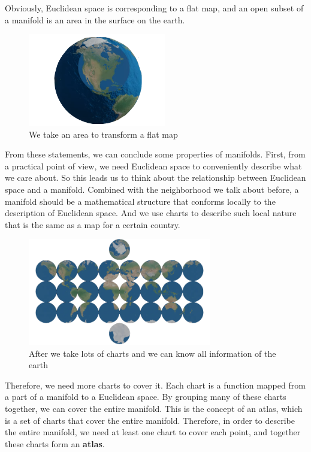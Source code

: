 Obviously, Euclidean space is corresponding to a flat map, and an open subset of a manifold is an area in the surface on the earth. 

\begin{figure}[htbp]
    \centering
    \includegraphics[width=6cm]{pic/earth.png}
    \caption{We take an area to transform a flat map}
\end{figure}

From these statements, we can conclude some properties of manifolds. First, from a practical point of view, we need Euclidean space to conveniently describe what we care about. So this leads us to think about the relationship between Euclidean space and a manifold. Combined with the neighborhood we talk about before, a manifold should be a mathematical structure that conforms locally to the description of Euclidean space. And we use charts to describe such local nature that is the same as a map for a certain country. 

\begin{figure}[htbp]
    \centering
    \includegraphics[width=8cm]{pic/earths.png}
    \caption{After we take lots of charts and we can know all information of the earth}
\end{figure}

Therefore, we need more charts to cover it. Each chart is a function mapped from a part of a manifold to a Euclidean space. By grouping many of these charts together, we can cover the entire manifold. This is the concept of an atlas, which is a set of charts that cover the entire manifold. Therefore, in order to describe the entire manifold, we need at least one chart to cover each point, and together these charts form an \textbf{atlas}.

